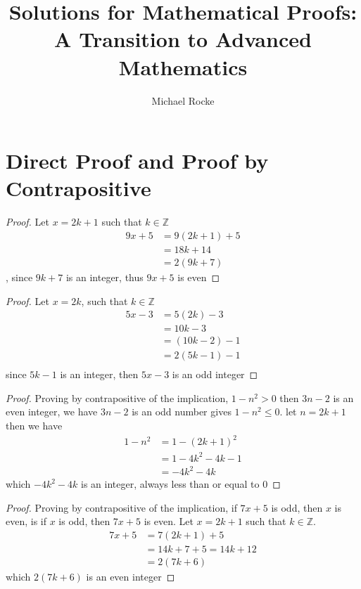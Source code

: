 \documentclass{report}
\title{Solutions for Mathematical Proofs: A Transition to Advanced Mathematics}
\author{Michael Rocke}
\begin{document}
\maketitle


\setcounter{chapter}{2}
\chapter{Direct Proof and Proof by Contrapositive}


\begin{proof}
  Let $x=2k+1$ such that $k \in \mathbb{Z}$
  \begin{align*}
    9x+5 &= 9(2k+1) + 5\\
    &= 18k + 14\\
    &= 2(9k+7)
  \end{align*}, since $9k+7$ is an integer, thus $9x+5$ is even 
\end{proof}


\begin{proof}
  Let $x=2k$, such that $k \in \mathbb{Z}$
  \begin{align*}
    5x - 3 &= 5(2k) - 3\\
           &= 10k - 3\\
           &= (10k - 2) - 1 \\
           &= 2(5k - 1) - 1 \\
  \end{align*}
  since $5k-1$ is an integer, then $5x-3$ is an odd integer
\end{proof}

\begin{proof}
  Proving by contrapositive of the implication,  $1-n^2 > 0$ then $3n-2$ is an even integer, we have $3n-2$ is an odd number gives $1-n^2 \le 0$.
  let $n = 2k + 1$ then we have
  \begin{align*}
    1 - n^2 &= 1 - {(2k + 1)}^2 \\
            &= 1 - 4k^2 - 4k - 1 \\
            &= -4k^2 - 4k
  \end{align*}
 which $-4k^2 -4k$ is an integer, always less than or equal to 0 
\end{proof}

\begin{proof}
  Proving by contrapositive of the implication, if $7x+5$ is odd, then $x$ is even, is if $x$ is odd, then $7x+5$ is even. Let $x = 2k + 1$ such that $k \in \mathbb{Z}$.
  \begin{align*}
    7x + 5 &= 7(2k + 1) + 5 \\
           &= 14k + 7 + 5 = 14k + 12 \\
           &= 2(7k + 6)
  \end{align*}
  which $2(7k + 6)$ is an even integer
\end{proof}
\end{document}
